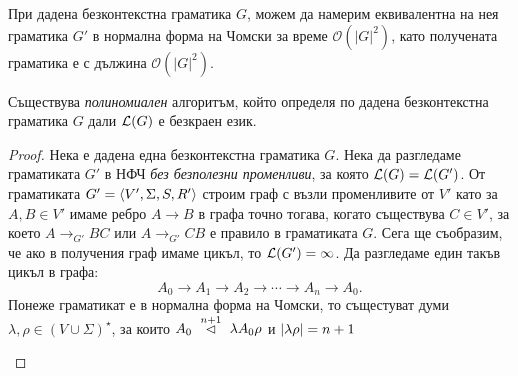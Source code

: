 \begin{theorem}
  При дадена безконтекстна граматика $G$, можем да намерим еквивалентна
  на нея граматика $G'$ в нормална форма на Чомски за време $\mathcal{O}(|G|^2)$,
  като получената граматика е с дължина $\mathcal{O}(|G|^2)$.
\end{theorem}

\begin{theorem}
  Съществува \emph{полиномиален} алгоритъм, който определя по дадена безконтекстна граматика $G$ дали $\mathcal{L}(G)$ е безкраен език.
\end{theorem}
\begin{proof}
  Нека е дадена една безконтекстна граматика $G$.
  Нека да разгледаме граматиката $G'$ в НФЧ {\em без безполезни променливи}, за която $\mathcal{L}(G) = \mathcal{L}(G')$.
  От граматиката $G' = \langle{V',\Sigma,S,R'}\rangle$ строим граф с възли променливите от $V'$ като
  за $A,B \in V'$ имаме ребро $A \to B$ в графа точно тогава, когато съществува $C \in V'$,
  за което $A \to_{G'} BC$ или $A \to_{G'} CB$ е правило в граматиката $G$.
  Сега ще съобразим, че ако в получения граф имаме цикъл, то $\mathcal{L}(G') = \infty$.
  Да разгледаме един такъв цикъл в графа:
  \[A_0 \to A_1 \to A_2 \to \cdots \to A_n \to A_0.\]
  Понеже граматикат е в нормална форма на Чомски, то същестуват думи $\lambda,\rho \in (V\cup\Sigma)^\star$, за които $A_0 ~\stackrel{{n+1}}{\lhd}~ \lambda A_0 \rho$ и $\vert{\lambda\rho}\vert = n+1$

  \begin{figure}[H]
    \begin{subfigure}[t]{0.5\textwidth}
    \centering
\end{subfigure}
\end{figure}
\end{proof}
